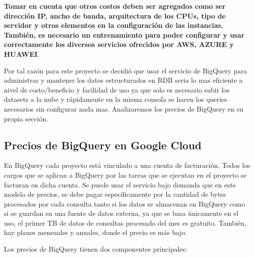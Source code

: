 \documentclass[12pt,a4paper,openright]{article}
\begin{document}
\newpage

\textbf{Tomar en cuenta que otros costos deben ser agregados como ser dirección IP, ancho de banda, arquitectura de los CPUs, tipo de servidor y otros elementos en la configuración de las instancias. También, es necesario un entrenamiento para poder configurar y usar correctamente los diversos servicios ofrecidos por AWS, AZURE y HUAWEI}.

Por tal razón para este proyecto se decidió que usar el servicio de BigQuery para administrar y mantener los datos estructurados en RDB seria lo mas eficiente a nivel de costo/beneficio y facilidad de uso ya que solo es necesario subir los datasets a la nube y rápidamente en la misma consola se hacen los queries necesarios sin configurar nada mas. Analizaremos los precios de BigQuery en su propia secci\'on.

\subsection{Precios de BigQuery en Google Cloud}

En BigQuery cada proyecto está vinculado a una cuenta de facturación. Todos los cargos que se aplican a BigQuery por las tareas que se ejecutan en el proyecto se facturan en dicha cuenta. Se puede usar el servicio bajo demanda que en este modelo de precios, se debe pagar específicamente por la cantidad de bytes procesados por cada consulta tanto si los datos se almacenan en BigQuery como si se guardan en una fuente de datos externa, ya que se basa únicamente en el uso, el primer TB de datos de consultas procesado del mes es gratuito. También, hay planes mensuales y anuales, donde el precio es más bajo.

Los precios de BigQuery tienen dos componentes principales:
\end{document}
